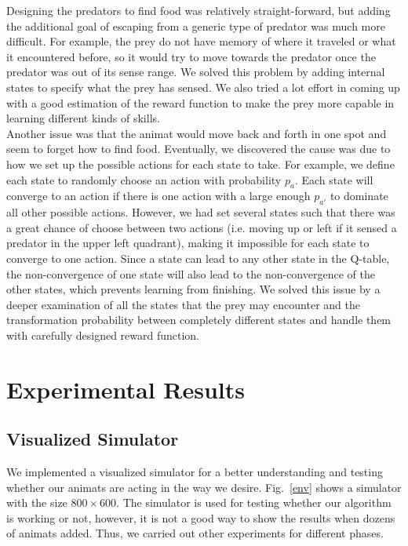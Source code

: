 \documentclass[10pt,conference,letterpaper,doublecolumn]{IEEEtran}
\begin{document}
Designing the predators to find food was relatively straight-forward, but adding the additional goal of escaping from a generic type of predator was much more difficult. For example, the prey do not have memory of where it traveled or what it encountered before, so it would try to move towards the predator once the predator was out of its sense range. We solved this problem by adding internal states to specify what the prey has sensed. We also tried a lot effort in coming up with a good estimation of the reward function to make the prey more capable in learning different kinds of skills. \\

Another issue was that the animat would move back and forth in one spot and seem to forget how to find food. Eventually, we discovered the cause was due to how we set up the possible actions for each state to take. For example, we define each state to randomly choose an action with probability $p_a$. Each state will converge to an action if there is one action with a large enough $p_{a'}$ to dominate all other possible actions. However, we had set several states such that there was a great chance of choose between two actions (i.e. moving up or left if it sensed a predator in the upper left quadrant), making it impossible for each state to converge to one action. Since a state can lead to any other state in the Q-table, the non-convergence of one state will also lead to the non-convergence of the other states, which prevents learning from finishing. We solved this issue by a deeper examination of all the states that the prey may encounter and the transformation probability between completely different states and handle them with carefully designed reward function.

\section{Experimental Results}
\subsection{Visualized Simulator}
We implemented a visualized simulator for a better understanding and testing whether our animats are acting in the way we desire. Fig.~\ref{env} shows a simulator with the size $800\times 600$. The simulator is used for testing whether our algorithm is working or not, however, it is not a good way to show the results when dozens of animats added. Thus, we carried out other experiments for different phases.
\end{document}
